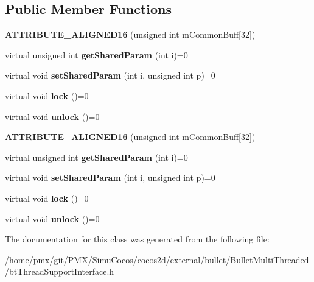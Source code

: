 \subsection*{Public Member Functions}
\begin{DoxyCompactItemize}
\item 
\mbox{\label{classbtCriticalSection_aca4159904f35d55d54fed017a2d2dc0b}} 
{\bfseries A\+T\+T\+R\+I\+B\+U\+T\+E\+\_\+\+A\+L\+I\+G\+N\+E\+D16} (unsigned int m\+Common\+Buff\mbox{[}32\mbox{]})
\item 
\mbox{\label{classbtCriticalSection_ad58e34e3eb0fc636edeb69fe17f793ac}} 
virtual unsigned int {\bfseries get\+Shared\+Param} (int i)=0
\item 
\mbox{\label{classbtCriticalSection_a8f0f5d49aeddc47b168f2176d191b7fb}} 
virtual void {\bfseries set\+Shared\+Param} (int i, unsigned int p)=0
\item 
\mbox{\label{classbtCriticalSection_a272e306b93f74fe288da28b019446b03}} 
virtual void {\bfseries lock} ()=0
\item 
\mbox{\label{classbtCriticalSection_acdfd8149ad4e36ce7ac7d13b2b220f44}} 
virtual void {\bfseries unlock} ()=0
\item 
\mbox{\label{classbtCriticalSection_aca4159904f35d55d54fed017a2d2dc0b}} 
{\bfseries A\+T\+T\+R\+I\+B\+U\+T\+E\+\_\+\+A\+L\+I\+G\+N\+E\+D16} (unsigned int m\+Common\+Buff\mbox{[}32\mbox{]})
\item 
\mbox{\label{classbtCriticalSection_ad58e34e3eb0fc636edeb69fe17f793ac}} 
virtual unsigned int {\bfseries get\+Shared\+Param} (int i)=0
\item 
\mbox{\label{classbtCriticalSection_a8f0f5d49aeddc47b168f2176d191b7fb}} 
virtual void {\bfseries set\+Shared\+Param} (int i, unsigned int p)=0
\item 
\mbox{\label{classbtCriticalSection_a272e306b93f74fe288da28b019446b03}} 
virtual void {\bfseries lock} ()=0
\item 
\mbox{\label{classbtCriticalSection_acdfd8149ad4e36ce7ac7d13b2b220f44}} 
virtual void {\bfseries unlock} ()=0
\end{DoxyCompactItemize}


The documentation for this class was generated from the following file\+:\begin{DoxyCompactItemize}
\item 
/home/pmx/git/\+P\+M\+X/\+Simu\+Cocos/cocos2d/external/bullet/\+Bullet\+Multi\+Threaded/bt\+Thread\+Support\+Interface.\+h\end{DoxyCompactItemize}
